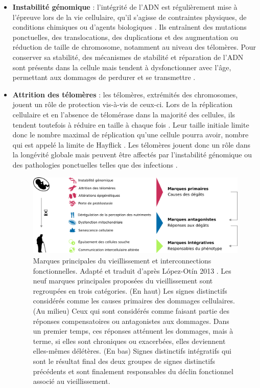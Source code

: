 \begin{itemize}
    \item \textbf{Instabilité génomique} : l'intégrité de l'\acrshort{ADN} est régulièrement mise à l'épreuve lors de la vie cellulaire, qu'il s'agisse de contraintes physiques, de conditions chimiques ou d'agents biologiques \cite{Moskalev2013Mar}. Ils entraînent des mutations ponctuelles, des translocations, des duplications et des augmentation ou réduction de taille de chromosome, notamment au niveau des télomères. Pour conserver sa stabilité, des mécanismes de stabilité et réparation de l'\acrshort{ADN} sont présents dans la cellule mais tendent à dysfonctionner avec l'âge, permettant aux dommages de perdurer et se transmettre \cite{Lord2012Jan}. 
    \item \textbf{Attrition des télomères} : les télomères, extrémités des chromosomes, jouent un rôle de protection vis-à-vis de ceux-ci. Lors de la réplication cellulaire et en l'absence de télomérase dans la majorité des cellules, ils tendent toutefois à réduire en taille à chaque fois \cite{Lopez-Otin2013}. Leur taille initiale limite donc le nombre maximal de réplication qu'une cellule pourra avoir, nombre qui est appelé la limite de Hayflick \cite{Hayflick1961Dec}. Les télomères jouent donc un rôle dans la longévité globale mais peuvent être affectés par l'instabilité génomique ou des pathologies ponctuelles telles que des infections \cite{Ilmonen2008May}.
    
\begin{figure}[b]
    \centering
    \includegraphics[width=\textwidth]{img/intro/4_aging/intro_4_aging_Lopez-Otin_hallmarks.pdf}
    \caption[Marques principales du vieillissement et interconnections fonctionnelles]{Marques principales du vieillissement et interconnections fonctionnelles. Adapté et traduit d'après López-Otín 2013 \cite{Lopez-Otin2013} \footnotemark. Les neuf marques principales proposées du vieillissement sont regroupées en trois catégories. (En haut) Les signes distinctifs considérés comme les causes primaires des dommages cellulaires. (Au milieu) Ceux qui sont considérés comme faisant partie des réponses compensatoires ou antagonistes aux dommages. Dans un premier temps, ces réponses atténuent les dommages, mais à terme, si elles sont chroniques ou exacerbées, elles deviennent elles-mêmes délétères. (En bas) Signes distinctifs intégratifs qui sont le résultat final des deux groupes de signes distinctifs précédents et sont finalement responsables du déclin fonctionnel associé au vieillissement.}
    \label{fig:hallmarks_aging}
\end{figure}


\end{itemize}
